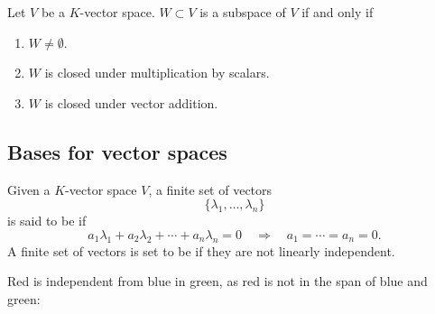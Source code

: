 \documentclass{ximera}
\begin{document}
\begin{lemma}
  Let $V$ be a $K$-vector space. $W\subset V$ is a subspace of $V$ if
  and only if
  \begin{enumerate}
    \item $W\ne \emptyset$.
    \item $W$ is closed under multiplication by scalars.
    \item $W$ is closed under vector addition.
  \end{enumerate}
\end{lemma}





\subsection{Bases for vector spaces}

\begin{definition}
  Given a $K$-vector space $V$, a finite set of vectors
  \[
    \{\lambda_1,\dots,\lambda_n\}
  \]
  is said to be  if
  \[
    a_1\lambda_1 + a_2\lambda_2 +\cdots + a_n\lambda_n = 0\quad \Rightarrow
    \quad
    a_1= \cdots =a_n = 0.
  \]
  A finite set of vectors is set to be  if
  they are not linearly independent.
\end{definition}

Red is independent from blue in green, as red is not in the span of blue and
green:

\begin{center}
\end{center}
\end{document}
